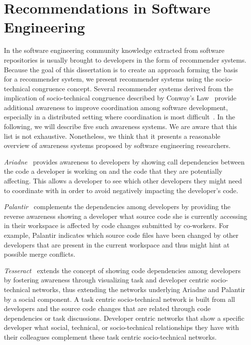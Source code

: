 \section{Recommendations in Software Engineering}
In the software engineering community knowledge extracted from software repositories is usually brought to developers in the form of recommender systems.
Because the goal of this dissertation is to create an approach forming the basis for a recommender system, we present recommender systems using the socio-technical congruence concept.
Several recommender systems derived from the implication of socio-technical congruence described by Conway's Law~\cite{conway:datamination:1968} provide additional awareness to improve coordination among software development, especially in a distributed setting where coordination is most difficult~\cite{olson:hci:2000}.
In the following, we will describe five such awareness systems.
We are aware that this list is not exhaustive. 
Nonetheless, we think that it presents a reasonable overview of awareness systems proposed by software engineering researchers.

\emph{Ariadne}~\cite{trainer2005:ariadne} provides awareness to developers by showing call dependencies between the code a developer is working on and the code that they are potentially affecting.
This allows a developer to see which other developers they might need to coordinate with in order to avoid negatively impacting the developer's code.

\emph{Palantir}~\cite{sarma:cscw:2002} complements the dependencies among developers by providing the reverse awareness  showing a developer what source code she is currently accessing in their workspace is affected by code changes submitted by co-workers.
For example, Palantir indicates which source code files have been changed by other developers that are present in the current workspace and thus might hint at possible merge conflicts.

\emph{Tesseract}~\cite{sarma:icse:2009} extends the concept of showing code dependencies among developers by fostering awareness through visualizing task and developer centric socio-technical networks, thus extending the networks underlying Ariadne and Palantir by a social component.
A task centric socio-technical network is built from all developers and the source code changes that are related through code dependencies or task discussions.
Developer centric networks that show a specific developer what social, technical, or socio-technical relationships they have with their colleagues complement these task centric socio-technical networks.

